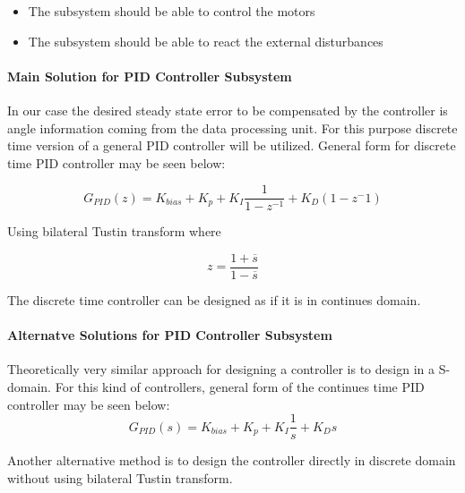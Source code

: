 \documentclass[a4paper,12pt]{article}
\begin{document}
	\begin{itemize}
		\item The subsystem should be able to control the motors
		\item The subsystem should be able to react the external disturbances
	\end{itemize} 
	
	\paragraph{Main Solution for PID Controller Subsystem}
	
		In our case the desired steady state error to be compensated by the controller is angle information coming from the data processing unit. For this purpose discrete time version of a general PID controller will be utilized. General form for discrete time PID controller may be seen below:
	
	$$ G_{PID}(z)=K_{bias}+K_p+K_I\frac{1}{1-z^{-1}}+K_D(1-z^-1)	$$
	
	Using bilateral Tustin transform where 
	
	$$ z=\frac{1+\overline{s}}{1-\overline{s}} $$
	
	The discrete time controller can be designed as if it is in continues domain.    
	
	
	
	
	
	
	\paragraph{Alternatve Solutions for PID Controller Subsystem}
		Theoretically very similar approach for designing a controller is to design in a S-domain. For this kind of controllers, general form of the continues time PID controller may be seen below:
		$$ G_{PID}(s)=K_{bias}+K_p+K_I\frac{1}{s}+K_Ds	$$
		
		Another alternative method is to design the controller directly in discrete domain without using bilateral Tustin transform. 
		
\end{document}
